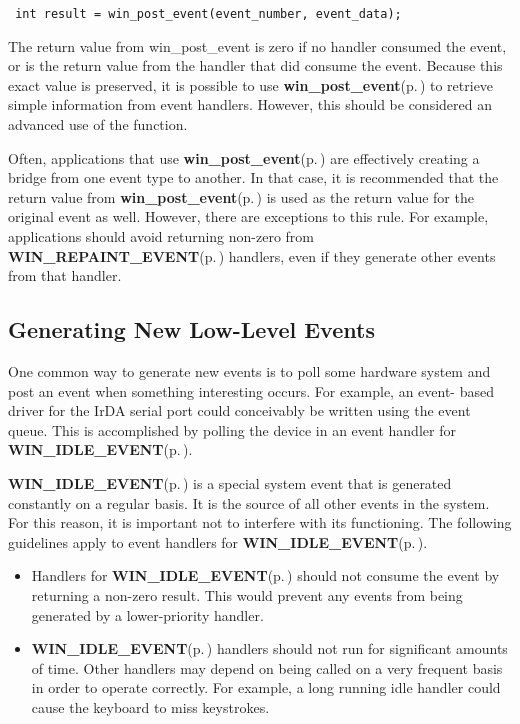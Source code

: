 \footnotesize\begin{verbatim} int result = win_post_event(event_number, event_data);
\end{verbatim}
\normalsize


The return value from win\_\-post\_\-event is zero if no handler consumed the event, or is the return value from the handler that did consume the event. Because this exact value is preserved, it is possible to use {\bf win\_\-post\_\-event}{\rm (p.\,\pageref{winevent_8h_a4})} to retrieve simple information from event handlers. However, this should be considered an advanced use of the function.

Often, applications that use {\bf win\_\-post\_\-event}{\rm (p.\,\pageref{winevent_8h_a4})} are effectively creating a bridge from one event type to another. In that case, it is recommended that the return value from {\bf win\_\-post\_\-event}{\rm (p.\,\pageref{winevent_8h_a4})} is used as the return value for the original event as well. However, there are exceptions to this rule. For example, applications should avoid returning non-zero from {\bf WIN\_\-REPAINT\_\-EVENT}{\rm (p.\,\pageref{winwidget_8h_a0})} handlers, even if they generate other events from that handler.\subsection{Generating New Low-Level Events}\label{winevent_8h_polling}
One common way to generate new events is to poll some hardware system and post an event when something interesting occurs. For example, an event- based driver for the Ir\-DA serial port could conceivably be written using the event queue. This is accomplished by polling the device in an event handler for {\bf WIN\_\-IDLE\_\-EVENT}{\rm (p.\,\pageref{winevent_8h_a0})}.

{\bf WIN\_\-IDLE\_\-EVENT}{\rm (p.\,\pageref{winevent_8h_a0})} is a special system event that is generated constantly on a regular basis. It is the source of all other events in the system. For this reason, it is important not to interfere with its functioning. The following guidelines apply to event handlers for {\bf WIN\_\-IDLE\_\-EVENT}{\rm (p.\,\pageref{winevent_8h_a0})}.

\begin{itemize}
\item Handlers for {\bf WIN\_\-IDLE\_\-EVENT}{\rm (p.\,\pageref{winevent_8h_a0})} should not consume the event by returning a non-zero result. This would prevent any events from being generated by a lower-priority handler.\end{itemize}
\begin{itemize}
\item {\bf WIN\_\-IDLE\_\-EVENT}{\rm (p.\,\pageref{winevent_8h_a0})} handlers should not run for significant amounts of time. Other handlers may depend on being called on a very frequent basis in order to operate correctly. For example, a long running idle handler could cause the keyboard to miss keystrokes.\end{itemize}
